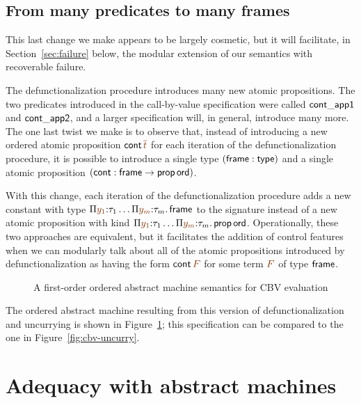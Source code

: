 \subsection{From many predicates to many frames}
\label{sec:defunc-type}

This last change we make appears to be largely cosmetic, but it will
facilitate, in Section~\ref{sec:failure} below, the modular extension
of our semantics with recoverable failure.

The defunctionalization procedure introduces many new atomic
propositions. The two predicates introduced in the call-by-value
specification were called ${\sf cont\_app1}$ and ${\sf cont\_app2}$,
and a larger specification will, in general, introduce many more.  The
one last twist we make is to observe that, instead of introducing a
new ordered atomic proposition ${\sf cont}\,\lf{\overline{t}}$ for each
iteration of the defunctionalization procedure, it is possible to
introduce a single type $({\sf frame} : {\sf type})$ and a single
atomic proposition $({\sf cont} : {\sf frame} \rightarrow {\sf
  prop\,ord})$.

With this change, each iteration of the defunctionalization
procedure adds a new constant with type $\Pi \lf{y_1}{:}\tau_1\ldots
\Pi \lf{y_m}{:}\tau_m.\, {\sf frame}$ to the signature instead of a 
new atomic proposition
with kind $\Pi \lf{y_1}{:}\tau_1\ldots \Pi \lf{y_m}{:}\tau_m.\, {\sf
  prop\,ord}$.  Operationally, these two approaches are equivalent, but
it facilitates the addition of control features when we can 
modularly talk about all of the atomic propositions introduced
by defunctionalization as having the form ${\sf cont}\,\lf{F}$ for
some term $\lf{F}$ of type ${\sf frame}$.

\begin{figure}
\caption{A first-order ordered abstract machine semantics for CBV
  evaluation}
\label{fig:cbv-ev-ssos-fun}
\end{figure}

The ordered abstract machine resulting from this version of
defunctionalization and uncurrying is shown in
Figure~\ref{fig:cbv-ev-ssos-fun}; this specification can be compared
to the one in Figure~\ref{fig:cbv-uncurry}.

\section{Adequacy with abstract machines}
\label{sec:nat-ssos-adequacy}

